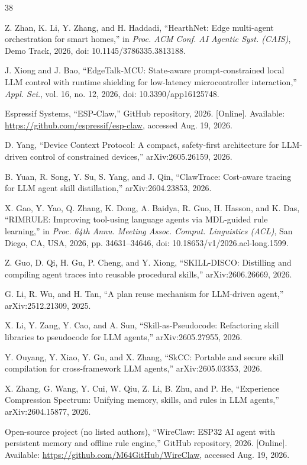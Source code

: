 \documentclass[review]{elsarticle}
\begin{document}
\begin{thebibliography}{38}

 Z. Zhan, K. Li, Y. Zhang, and H. Haddadi, ``HearthNet: Edge
multi-agent orchestration for smart homes,'' in \emph{Proc. ACM Conf. AI
Agentic Syst. (CAIS)}, Demo Track, 2026, doi: 10.1145/3786335.3813188.

 J. Xiong and J. Bao, ``EdgeTalk-MCU: State-aware prompt-constrained
local LLM control with runtime shielding for low-latency microcontroller
interaction,'' \emph{Appl. Sci.}, vol. 16, no. 12, 2026, doi:
10.3390/app16125748.

 Espressif Systems, ``ESP-Claw,'' GitHub repository, 2026.
[Online]. Available: \url{https://github.com/espressif/esp-claw}, accessed
Aug. 19, 2026.

 D. Yang, ``Device Context Protocol: A compact, safety-first
architecture for LLM-driven control of constrained devices,''
arXiv:2605.26159, 2026.

 B. Yuan, R. Song, Y. Su, S. Yang, and J. Qin, ``ClawTrace:
Cost-aware tracing for LLM agent skill distillation,'' arXiv:2604.23853,
2026.

 X. Gao, Y. Yao, Q. Zhang, K. Dong, A. Baidya, R. Guo, H. Hasson,
and K. Das, ``RIMRULE: Improving tool-using language agents via MDL-guided
rule learning,'' in \emph{Proc. 64th Annu. Meeting Assoc. Comput. Linguistics
(ACL)}, San Diego, CA, USA, 2026, pp. 34631--34646, doi:
10.18653/v1/2026.acl-long.1599.

 Z. Guo, D. Qi, H. Gu, P. Cheng, and Y. Xiong, ``SKILL-DISCO:
Distilling and compiling agent traces into reusable procedural skills,''
arXiv:2606.26669, 2026.

 G. Li, R. Wu, and H. Tan, ``A plan reuse mechanism for LLM-driven
agent,'' arXiv:2512.21309, 2025.

 X. Li, Y. Zang, Y. Cao, and A. Sun, ``Skill-as-Pseudocode:
Refactoring skill libraries to pseudocode for LLM agents,'' arXiv:2605.27955,
2026.

 Y. Ouyang, Y. Xiao, Y. Gu, and X. Zhang, ``SkCC: Portable and
secure skill compilation for cross-framework LLM agents,'' arXiv:2605.03353,
2026.

 X. Zhang, G. Wang, Y. Cui, W. Qiu, Z. Li, B. Zhu, and P. He,
``Experience Compression Spectrum: Unifying memory, skills, and rules in LLM
agents,'' arXiv:2604.15877, 2026.

 Open-source project (no listed authors), ``WireClaw: ESP32 AI
agent with persistent memory and offline rule engine,'' GitHub repository,
2026. [Online]. Available:
\url{https://github.com/M64GitHub/WireClaw}, accessed Aug. 19, 2026.


\end{thebibliography}
\end{document}
